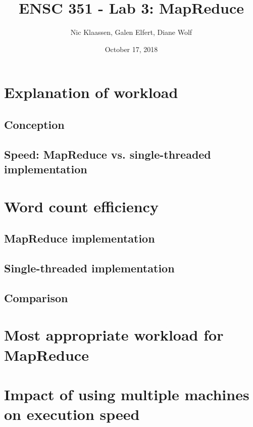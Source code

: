 \documentclass[12pt, letterpaper]{article}
\begin{document}
\title{ENSC 351 - Lab 3: MapReduce}
\date{October 17, 2018}
\author{Nic Klaassen, Galen Elfert, Diane Wolf}
\maketitle
\setlength\parindent{1cm}
\section{Explanation of workload}
\subsection{Conception}
\subsection{Speed: MapReduce vs. single-threaded implementation}

\section{Word count efficiency}
\subsection{MapReduce implementation}
\subsection{Single-threaded implementation}
\subsection{Comparison}

\section{Most appropriate workload for MapReduce}

\section{Impact of using multiple machines on execution speed}
\end{document}
